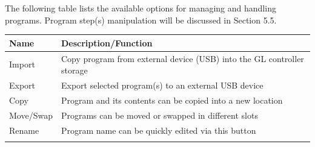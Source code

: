 The following table lists the available options for managing and
handling programs. Program step(s) manipulation will be discussed in
Section 5.5.

\begin{longtable}[]{@{}ll@{}}
\toprule
\begin{minipage}[b]{0.20\columnwidth}\raggedright
Name\strut
\end{minipage} & \begin{minipage}[b]{0.74\columnwidth}\raggedright
Description/Function\strut
\end{minipage}\tabularnewline
\midrule
\endhead
\begin{minipage}[t]{0.20\columnwidth}\raggedright
Import\strut
\end{minipage} & \begin{minipage}[t]{0.74\columnwidth}\raggedright
Copy program from external device (USB) into the GL controller
storage\strut
\end{minipage}\tabularnewline
\begin{minipage}[t]{0.20\columnwidth}\raggedright
Export\strut
\end{minipage} & \begin{minipage}[t]{0.74\columnwidth}\raggedright
Export selected program(s) to an external USB device\strut
\end{minipage}\tabularnewline
\begin{minipage}[t]{0.20\columnwidth}\raggedright
Copy\strut
\end{minipage} & \begin{minipage}[t]{0.74\columnwidth}\raggedright
Program and its contents can be copied into a new location\strut
\end{minipage}\tabularnewline
\begin{minipage}[t]{0.20\columnwidth}\raggedright
Move/Swap\strut
\end{minipage} & \begin{minipage}[t]{0.74\columnwidth}\raggedright
Programs can be moved or swapped in different slots\strut
\end{minipage}\tabularnewline
\begin{minipage}[t]{0.20\columnwidth}\raggedright
Rename\strut
\end{minipage} & \begin{minipage}[t]{0.74\columnwidth}\raggedright
Program name can be quickly edited via this button\strut
\end{minipage}\tabularnewline
\begin{minipage}[t]{0.20\columnwidth}\raggedright

\end{minipage}
\end{longtable}
